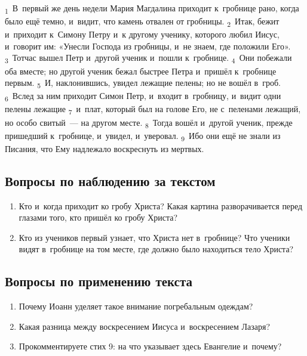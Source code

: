 \documentclass[a4paper,12pt]{article}
\begin{document}
\textsubscript{1}~В~первый же день недели Мария Магдалина приходит к~гробнице рано, когда было ещё темно, и~видит, что камень отвален от гробницы.
\textsubscript{2}~Итак, бежит и~приходит к~Симону Петру и~к другому ученику, которого любил Иисус, и~говорит им: «Унесли Господа из гробницы, и~не знаем, где положили Его».
\textsubscript{3}~Тотчас вышел Петр и~другой ученик и~пошли к~гробнице.
\textsubscript{4}~Они побежали оба вместе; но другой ученик бежал быстрее Петра и~пришёл к~гробнице первым.
\textsubscript{5}~И, наклонившись, увидел лежащие пелены; но не вошёл в~гроб.
\textsubscript{6}~Вслед за ним приходит Симон Петр, и~входит в~гробницу, и~видит одни пелены лежащие
\textsubscript{7}~и~плат, который был на голове Его, не с~пеленами лежащий, но особо свитый~--- на другом месте.
\textsubscript{8}~Тогда вошёл и~другой ученик, прежде пришедший к~гробнице, и~увидел, и~уверовал.
\textsubscript{9}~Ибо они ещё не знали из Писания, что Ему надлежало воскреснуть из мертвых. 

\subsection*{Вопросы по наблюдению за текстом}
\begin{enumerate}
    \item Кто и~когда приходит ко гробу Христа? Какая картина разворачивается перед глазами того, кто пришёл ко гробу Христа? 
    
    \myline
    
    \myline
    \item Кто из учеников первый узнает, что Христа нет в~гробнице? Что ученики видят в~гробнице на том месте, где должно было находиться тело Христа? 
    
    \myline
    
    \myline
\end{enumerate}

\subsection*{Вопросы по применению текста} 
\begin{enumerate}
    \item Почему Иоанн уделяет такое внимание погребальным одеждам? 
    
    \myline
    
    \myline
    \item Какая разница между воскресением Иисуса и~воскресением Лазаря? 
    
    \myline
    
    \myline
    \item Прокомментируете стих 9: на что указывает здесь Евангелие и~почему?
    
    \myline
    
    \myline
\end{enumerate}
\end{document}
